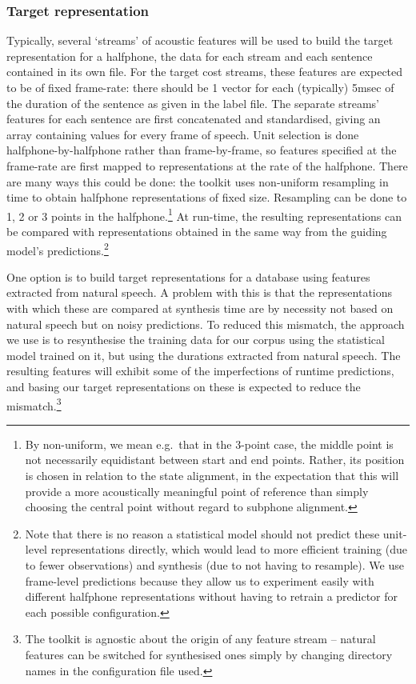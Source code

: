 \subsubsection{Target representation}
Typically, several `streams' of acoustic features will be used to build the target representation for a halfphone, the data for each stream and each sentence contained in its own file. For the target cost streams, these features are expected to be of fixed frame-rate: there should be 1 vector for each (typically) 5msec of the duration of the sentence as given in the label file. The separate streams' features for each sentence are first concatenated and standardised, giving an array containing values for every frame of speech. Unit selection is done halfphone-by-halfphone rather than frame-by-frame, so features specified at the frame-rate are first mapped to representations at the rate of the halfphone. There are many ways this could be done: the toolkit uses non-uniform resampling in time to obtain halfphone representations of fixed size. Resampling can be done to 1, 2 or 3 points in the halfphone.\footnote{By non-uniform, we mean e.g.\ that in the 3-point case, the middle point is not necessarily equidistant between start and end points. Rather, its position is chosen in relation to the state alignment, in the expectation that this will provide a more acoustically meaningful point of reference than simply choosing the central point without regard to subphone alignment.} At run-time, the resulting representations can be compared with representations obtained in the same way from the guiding model's predictions.\footnote{Note that there is no reason a statistical model should not predict these unit-level representations directly, which would lead to more efficient training (due to fewer observations) and synthesis (due to not having to resample). We use frame-level predictions because they allow us to experiment easily with different halfphone representations without having to retrain a predictor for each possible configuration.}

One option is to build target representations for a database using features extracted from natural speech. A problem with this is that the representations with which these are compared at synthesis time are by necessity not based on natural speech but on noisy predictions. To reduced this mismatch, the approach we use is to resynthesise the training data for our corpus using the statistical model trained on it, but using the durations extracted from natural speech. The resulting features will exhibit some of the imperfections of runtime predictions, and basing our target representations on these is expected to reduce the mismatch.\footnote{The toolkit is agnostic about the origin of any feature stream -- natural features can be switched for synthesised ones simply by changing directory names in the configuration file used.}


